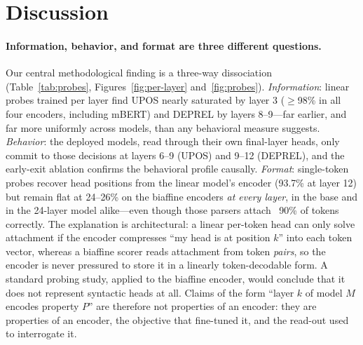 
\section{Discussion}
\label{sec:layerwise-discussion}

\paragraph{Information, behavior, and format are three different questions.}
Our central methodological finding is a three-way dissociation
(Table~\ref{tab:probes}, Figures~\ref{fig:per-layer} and~\ref{fig:probes}).
\emph{Information}: linear probes trained per layer find UPOS nearly saturated
by layer 3 ($\geq$98\% in all four encoders, including mBERT) and DEPREL by
layers 8--9---far earlier, and far more uniformly across models, than any
behavioral measure suggests. \emph{Behavior}: the deployed models, read
through their own final-layer heads, only commit to those decisions at layers
6--9 (UPOS) and 9--12 (DEPREL), and the early-exit ablation confirms the
behavioral profile causally. \emph{Format}: single-token probes recover head
positions from the linear model's encoder (93.7\% at layer 12) but remain flat
at 24--26\% on the biaffine encoders \emph{at every layer}, in the base and in
the 24-layer model alike---even though those parsers attach ~90\% of tokens
correctly. The explanation is architectural: a linear per-token head can only
solve attachment if the encoder compresses ``my head is at position $k$'' into
each token vector, whereas a biaffine scorer reads attachment from token
\emph{pairs}, so the encoder is never pressured to store it in a linearly
token-decodable form. A standard probing study, applied to the biaffine
encoder, would conclude that it does not represent syntactic heads at all.
Claims of the form ``layer $k$ of model $M$ encodes property $P$'' are
therefore not properties of an encoder: they are properties of an encoder, the
objective that fine-tuned it, and the read-out used to interrogate it.

